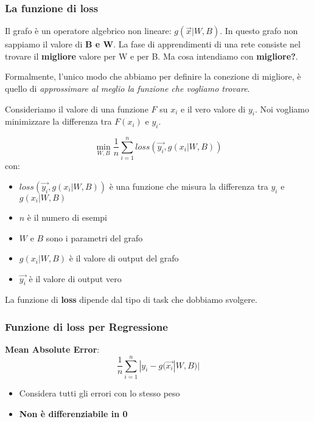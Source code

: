 \subsubsection{La funzione di loss}
Il grafo è un operatore algebrico non lineare: $g(\vec{x}|W,B)$. In questo
grafo non sappiamo il valore di \textbf{B e W}. La fase di apprendimenti di una
rete consiste nel trovare il \textbf{migliore} valore per W e per B. Ma cosa
intendiamo con \textbf{migliore?}.

Formalmente, l'unico modo che abbiamo per definire la conezione di migliore, è
quello di \textit{approssimare al meglio la funzione che vogliamo trovare}.


Consideriamo il valore di una funzione $F$ su $x_i$ e il vero valore di $y_i$.
Noi vogliamo minimizzare la differenza tra $F(x_i)$ e $y_i$.

\begin{equation}
    \min_{W,B}\frac{1}{n} \sum_{i=1}^n loss(\vec{y_i}, g(x_i|W,B))
\end{equation}
con:
\begin{itemize}
    \item $loss(\vec{y_i}, g(x_i|W,B))$ è una funzione che misura la differenza tra $y_i$ e $g(x_i|W,B)$
    \item $n$ è il numero di esempi
    \item $W$ e $B$ sono i parametri del grafo
    \item $g(x_i|W,B)$ è il valore di output del grafo
    \item $\vec{y_i}$ è il valore di output vero
\end{itemize}

La funzione di \textbf{loss} dipende dal tipo di task che dobbiamo svolgere.

\subsubsection{Funzione di loss per Regressione}
\textbf{Mean Absolute Error}:
\begin{equation}
    \frac{1}{n} \sum_{i=1}^n |y_i - g(\vec{x_i}|W,B)|
\end{equation}
\begin{itemize}
    \item Considera tutti gli errori con lo stesso peso
    \item \textbf{Non è differenziabile in 0}
\end{itemize}

